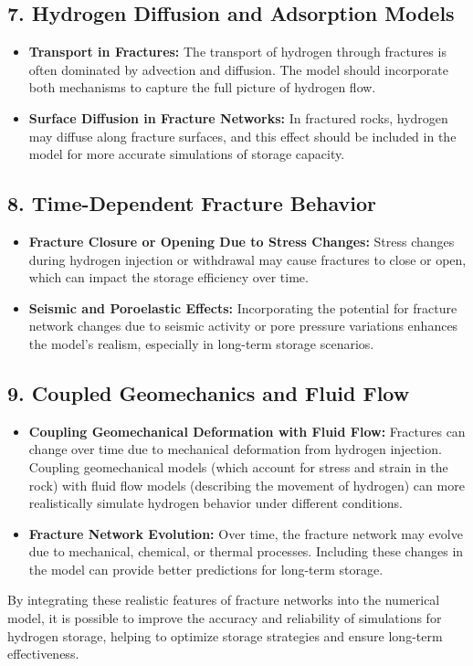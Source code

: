 \documentclass{article}
\begin{document}
\subsection{7. Hydrogen Diffusion and Adsorption Models}
\begin{itemize}
    \item \textbf{Transport in Fractures:} The transport of hydrogen through fractures is often dominated by advection and diffusion. The model should incorporate both mechanisms to capture the full picture of hydrogen flow.
    \item \textbf{Surface Diffusion in Fracture Networks:} In fractured rocks, hydrogen may diffuse along fracture surfaces, and this effect should be included in the model for more accurate simulations of storage capacity.
\end{itemize}

\subsection{8. Time-Dependent Fracture Behavior}
\begin{itemize}
    \item \textbf{Fracture Closure or Opening Due to Stress Changes:} Stress changes during hydrogen injection or withdrawal may cause fractures to close or open, which can impact the storage efficiency over time.
    \item \textbf{Seismic and Poroelastic Effects:} Incorporating the potential for fracture network changes due to seismic activity or pore pressure variations enhances the model’s realism, especially in long-term storage scenarios.
\end{itemize}

\subsection{9. Coupled Geomechanics and Fluid Flow}
\begin{itemize}
    \item \textbf{Coupling Geomechanical Deformation with Fluid Flow:} Fractures can change over time due to mechanical deformation from hydrogen injection. Coupling geomechanical models (which account for stress and strain in the rock) with fluid flow models (describing the movement of hydrogen) can more realistically simulate hydrogen behavior under different conditions.
    \item \textbf{Fracture Network Evolution:} Over time, the fracture network may evolve due to mechanical, chemical, or thermal processes. Including these changes in the model can provide better predictions for long-term storage.
\end{itemize}

By integrating these realistic features of fracture networks into the numerical model, it is possible to improve the accuracy and reliability of simulations for hydrogen storage, helping to optimize storage strategies and ensure long-term effectiveness.

\FloatBarrier  %
\end{document}
